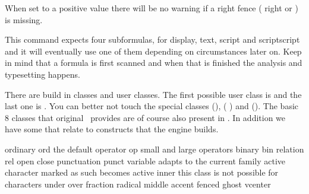 When set to a positive value there will be no warning if a right fence (\prm
{right} or ) is missing.

\stopnewprimitive

\startoldprimitive[title={\prm {mathchoice}}]

This command expects four subformulas, for display, text, script and scriptscript
and it will eventually use one of them depending on circumstances later on. Keep
in mind that a formula is first scanned and when that is finished the analysis
and typesetting happens.

\stopoldprimitive

\startnewprimitive[title={\prm {mathclass}}]

There are build in classes and user classes. The first possible user class is
 and the last one is
. You can better not touch
the special classes  (\number \mathallcode),  (\number
\mathbegincode) and  (\number \mathendcode). The basic 8 classes that
original \TEX\ provides are of course also present in \LUAMETATEX. In addition we
have some that relate to constructs that the engine builds.

\starttabulate[|l|l|T|l|]
\FL
\NC ordinary        \NC ord    \NC \the\mathordinarycode    \NC the default \NR
\NC operator        \NC op     \NC \the\mathoperatorcode    \NC small and large operators \NC \NR
\NC binary          \NC bin    \NC \the\mathbinarycode      \NC \NC \NR
\NC relation        \NC rel    \NC \the\mathrelationcode    \NC \NC \NR
\NC open            \NC        \NC \the\mathopencode        \NC \NC \NR
\NC close           \NC        \NC \the\mathclosecode       \NC \NC \NR
\NC punctuation     \NC punct  \NC \the\mathpunctuationcode \NC \NC \NR
\NC variable        \NC        \NC \the\mathvariablecode    \NC adapts to the current family \NC \NR
\NC active          \NC        \NC \the\mathactivecode      \NC character marked as such becomes active \NR
\NC inner           \NC        \NC \the\mathinnercode       \NC this class is not possible for characters \NR
\ML
\NC under           \NC        \NC \the\mathundercode       \NC \NC \NR
\NC over            \NC        \NC \the\mathovercode        \NC \NC \NR
\NC fraction        \NC        \NC \the\mathfractioncode    \NC \NC \NR
\NC radical         \NC        \NC \the\mathradicalcode     \NC \NC \NR
\NC middle          \NC        \NC \the\mathmiddlecode      \NC \NC \NR
\NC accent          \NC        \NC \the\mathaccentcode      \NC \NC \NR
\NC fenced          \NC        \NC \the\mathfencedcode      \NC \NC \NR
\NC ghost           \NC        \NC \the\mathghostcode       \NC \NC \NR
\NC vcenter         \NC        \NC \the\mathvcentercode     \NC \NC \NR
\LL
\stoptabulate

